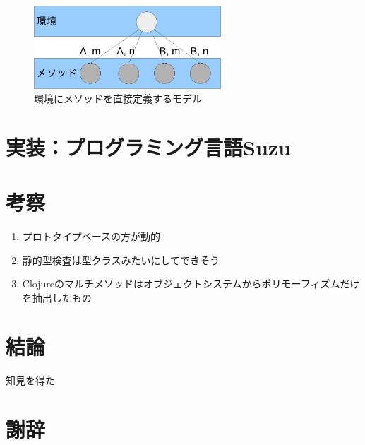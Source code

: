 \documentclass[a4paper,11pt,dvipdfmx]{jreport}
\begin{document}
\begin{figure}[htbp]
	\centering
	\includegraphics[width=7cm]{fig/trees_containerless-crop.pdf}
	\caption{環境にメソッドを直接定義するモデル}
	\label{figure:containerlsss-model}
\end{figure}


\chapter{実装：プログラミング言語Suzu}

\chapter{考察}

\begin{enumerate}
\item プロトタイプベースの方が動的
\item 静的型検査は型クラスみたいにしてできそう
\item Clojureのマルチメソッドはオブジェクトシステムからポリモーフィズムだけを抽出したもの
\end{enumerate}

\chapter{結論}

知見を得た

\chapter*{謝辞}

\newpage

\renewcommand{\bibname}{参考文献}




%
%
\end{document}
